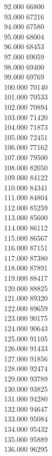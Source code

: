 { 92.000	66800 \\
 93.000	67216 \\
 94.000	67580 \\
 95.000	68004 \\
 96.000	68453 \\
 97.000	69059 \\
 98.000	69400 \\
 99.000	69769 \\
 100.000	70140 \\
 101.000	70533 \\
 102.000	70894 \\
 103.000	71420 \\
 104.000	71873 \\
 105.000	72451 \\
 106.000	77162 \\
 107.000	79500 \\
 108.000	82050 \\
 109.000	84122 \\
 110.000	84341 \\
 111.000	84804 \\
 112.000	85259 \\
 113.000	85600 \\
 114.000	86112 \\
 115.000	86567 \\
 116.000	87151 \\
 117.000	87380 \\
 118.000	87891 \\
 119.000	88417 \\
 120.000	88825 \\
 121.000	89320 \\
 122.000	89659 \\
 123.000	90175 \\
 124.000	90643 \\
 125.000	91105 \\
 126.000	91433 \\
 127.000	91856 \\
 128.000	92474 \\
 129.000	93789 \\
 130.000	93825 \\
 131.000	94280 \\
 132.000	94647 \\
 133.000	95084 \\
 134.000	95432 \\
 135.000	95889 \\
 136.000	96295 \\
}
